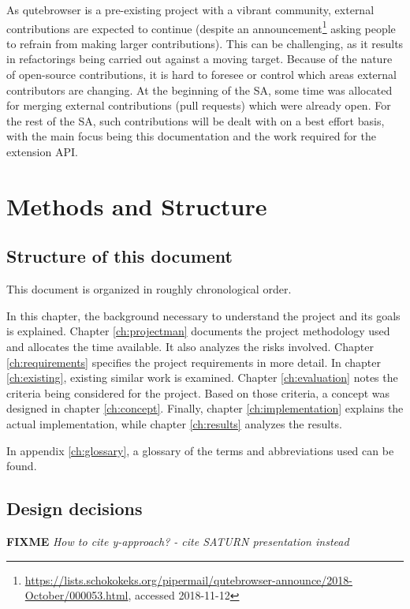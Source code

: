 \documentclass[a4paper,parskip=full]{scrreprt}
\newcommand{\fixme}[1]{\textbf{FIXME} \emph{#1}}
\begin{document}
As qutebrowser is a pre-existing project with a vibrant community, external
contributions are expected to continue (despite an
announcement\footnote{\url{https://lists.schokokeks.org/pipermail/qutebrowser-announce/2018-October/000053.html}, accessed 2018-11-12}
asking people to refrain from making larger contributions). This can be challenging,
as it results in refactorings being carried out against a moving target. Because
of the nature of open-source contributions,
it is hard to foresee or control which areas external contributors are changing.
At the beginning of the SA, some time was allocated for merging external
contributions (pull requests) which were already open. For the rest of the SA,
such contributions will be dealt with on a best effort basis, with the main
focus being this documentation and the work required for the extension API.

\section{Methods and Structure}
\subsection{Structure of this document}
This document is organized in roughly chronological order.

In this chapter, the background necessary to understand the
project and its goals is explained. Chapter \ref{ch:projectman} documents the
project methodology used and allocates the time available.
It also analyzes the risks involved. Chapter \ref{ch:requirements} specifies the
project requirements in more detail. In chapter \ref{ch:existing}, existing
similar work is examined. Chapter \ref{ch:evaluation} notes the criteria being
considered for the project. Based on those criteria, a concept was designed in chapter
\ref{ch:concept}. Finally, chapter \ref{ch:implementation} explains the actual
implementation, while chapter \ref{ch:results} analyzes the results.

In appendix \ref{ch:glossary}, a glossary of the terms and abbreviations used
can be found.

\subsection{Design decisions}
\fixme{How to cite y-approach? - cite SATURN presentation instead}
\end{document}
